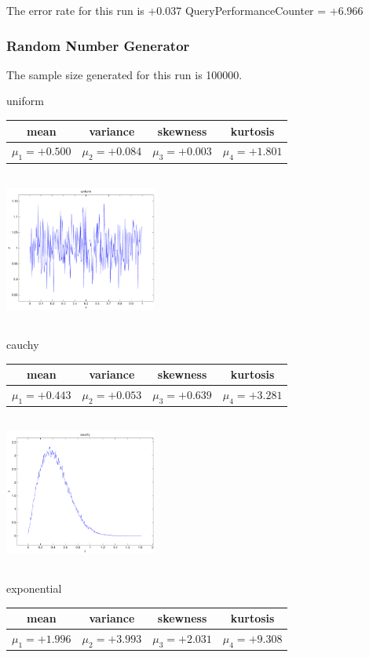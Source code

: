 \documentclass[12pt]{article}
\theoremstyle{definition}
\theoremstyle{remark}
\numberwithin{equation}{section}
\begin{document}
The error rate for this run is +0.037\newline
QueryPerformanceCounter  =  +6.966
\subsubsection{Random Number Generator }
The sample size generated for this run is 100000.

\newpage
uniform \begin{tabular}{|c|c|c|c|}  mean & variance & skewness & kurtosis \\  \hline
$\mu_1 = +0.500$ & $\mu_2 = +0.084$ & $\mu_3 = +0.003$ & $\mu_4 =+1.801$ \\
\end{tabular}

\includegraphics[width=5cm,height=5cm]{uniform.pdf}

cauchy \begin{tabular}{|c|c|c|c|}  mean & variance & skewness & kurtosis \\  \hline
$\mu_1 = +0.443$ & $\mu_2 = +0.053$ & $\mu_3 = +0.639$ & $\mu_4 =+3.281$ \\
\end{tabular}

\includegraphics[width=5cm,height=5cm]{cauchy.pdf}

exponential \begin{tabular}{|c|c|c|c|}  mean & variance & skewness & kurtosis \\  \hline
$\mu_1 = +1.996$ & $\mu_2 = +3.993$ & $\mu_3 = +2.031$ & $\mu_4 =+9.308$ \\
\end{tabular}
\end{document}
